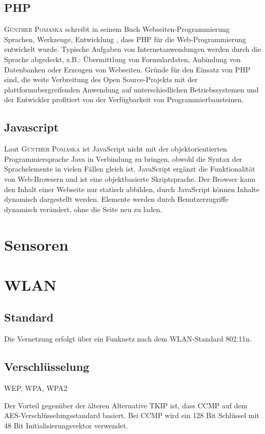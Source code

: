 \subsection{\ac{PHP}}
\textsc{Günther Pomaska} schreibt in seinem Buch Webseiten-Programmierung Sprachen, Werkzeuge, Entwicklung \cite{pomaska2012webseiten-programmierung}, dass \ac{PHP} für die Web-Programmierung entwickelt wurde. Typische Aufgaben von Internetanwendungen werden durch die Sprache abgedeckt, z.B.: Übermittlung von Formulardaten, Anbindung von Datenbanken oder Erzeugen von Webseiten. Gründe für den Einsatz von \ac{PHP} sind, die weite Verbreitung des Open Source-Projekts mit der plattformubergreifenden Anwendung auf unterschiedlichen Betriebssystemen und der Entwickler profitiert von der Verfügbarkeit von Programmierbausteinen.

\subsection{Javascript}
Laut \textsc{Günther Pomaska} \cite{pomaska2012webseiten-programmierung} ist JavaScript nicht mit der objektorientierten Programmiersprache Java in Verbindung zu bringen, obwohl die Syntax der Sprachelemente in vielen Fällen gleich ist. JavaScript ergänzt die Funktionalität von Web-Browsern und ist eine objektbasierte Skriptsprache. Der Browser kann den Inhalt einer Webseite nur statisch abbilden, durch JavaScript können Inhalte dynamisch dargestellt werden. Elemente werden durch Benutzerzugriffe dynamisch verändert, ohne die Seite neu zu laden.

\section{Sensoren}\label{Sensoren_Planung}

\section{WLAN}
\subsection{Standard}

Die Vernetzung erfolgt über ein Funknetz nach dem WLAN-Standard 802.11n. 

\subsection{Verschlüsselung}
WEP, WPA, WPA2

Der Vorteil gegenüber der älteren Alternative TKIP ist, dass \ac{CCMP} auf dem AES-Verschlüsselungsstandard basiert. Bei \ac{CCMP} wird ein 128 Bit Schlüssel mit 48 Bit Initialisierungsvektor verwendet.


